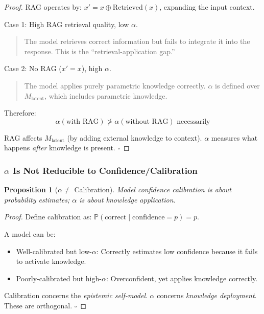 \documentclass[11pt,a4paper]{article}
\newtheorem{proposition}[theorem]{Proposition}
\begin{document}
\begin{proof}
RAG operates by: $x' = x \oplus \text{Retrieved}(x)$, expanding the input context.

Case 1: High RAG retrieval quality, low $\alpha$.
\begin{quote}
The model retrieves correct information but fails to integrate it into the response. This is the ``retrieval-application gap.''
\end{quote}

Case 2: No RAG ($x' = x$), high $\alpha$.
\begin{quote}
The model applies purely parametric knowledge correctly. $\alpha$ is defined over $M_{\text{latent}}$, which includes parametric knowledge.
\end{quote}

Therefore:
\[
\alpha(\text{with RAG}) \not> \alpha(\text{without RAG}) \text{ necessarily}
\]

RAG affects $M_{\text{latent}}$ (by adding external knowledge to context). $\alpha$ measures what happens \emph{after} knowledge is present. $\square$
\end{proof}


\subsubsection{$\alpha$ Is Not Reducible to Confidence/Calibration}

\begin{proposition}[$\alpha \neq $ Calibration]
Model confidence calibration is about probability estimates; $\alpha$ is about knowledge application.
\end{proposition}

\begin{proof}
Define calibration as: $\mathbb{P}(\text{correct} \mid \text{confidence} = p) = p$.

A model can be:
\begin{itemize}
    \item Well-calibrated but low-$\alpha$: Correctly estimates low confidence because it fails to activate knowledge.
    \item Poorly-calibrated but high-$\alpha$: Overconfident, yet applies knowledge correctly.
\end{itemize}

Calibration concerns the \emph{epistemic self-model}. $\alpha$ concerns \emph{knowledge deployment}. These are orthogonal. $\square$
\end{proof}
\end{document}
